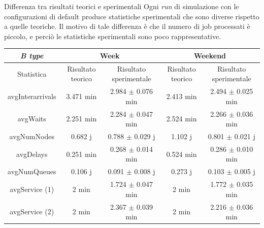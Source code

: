 \documentclass[xcolor=table]{beamer}
\begin{document}
\begin{frame}{Differenza tra risultati teorici e sperimentali}\justifying
Ogni \textit{run} di simulazione con le configurazioni di default produce statistiche sperimentali che sono diverse rispetto a quelle teoriche. Il motivo di tale differenza è che il numero di job processati è piccolo, e perciò le statistiche sperimentali sono poco rappresentative.
\bigskip

\centering
\begin{adjustbox}{scale=0.6}

\begin{tabular}{ |c|c|c|c|c| }
\hline
\cellcolor{cellcolor} \textit{B type} & \multicolumn{2}{c|}{\cellcolor{cellcolor}Week} & \multicolumn{2}{c|}{\cellcolor{cellcolor}Weekend} \\
\hline
\cellcolor{cellcolor}Statistica & \cellcolor{cellcolor}Risultato teorico & \cellcolor{cellcolor}Risultato sperimentale & \cellcolor{cellcolor}Risultato teorico & \cellcolor{cellcolor}Risultato sperimentale \\
\hline
\hline
avgInterarrivals & 3.471 min & 2.984 $\pm$ 0.076 min & 2.413 min & 2.494 $\pm$ 0.025 min \\
\hline
avgWaits & 2.251 min & 2.284 $\pm$ 0.047 min & 2.524 min & 2.266 $\pm$ 0.036 min \\
\hline
avgNumNodes & 0.682 j & 0.788 $\pm$ 0.029 j & 1.102 j & 0.801 $\pm$ 0.021 j  \\
\hline
avgDelays & 0.251 min & 0.268 $\pm$ 0.014 min & 0.524 min & 0.286 $\pm$ 0.010 min \\
\hline
avgNumQueues & 0.106 j & 0.091 $\pm$ 0.008 j & 0.273 j & 0.103 $\pm$  0.005 j \\
\hline
avgService (1) & 2 min & 1.724 $\pm$ 0.047 min & 2 min & 1.772 $\pm$  0.035 min \\
\hline
avgService (2) & 2 min & 2.367 $\pm$ 0.039 min & 2 min & 2.216 $\pm$ 0.036 min \\
\hline
\end{tabular}
\end{adjustbox}
\bigskip


\end{frame}
\end{document}
